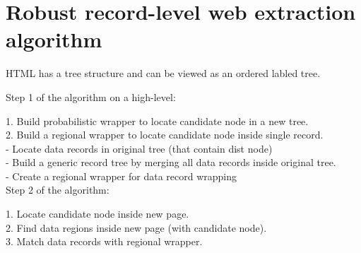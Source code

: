 \chapter{Robust record-level web extraction algorithm}

HTML has a tree structure and can be viewed as an ordered labled tree.

Step 1 of the algorithm on a high-level:

1. Build probabilistic wrapper to locate candidate node in a new tree.\\
2. Build a regional wrapper to locate candidate node inside single record.\\
   - Locate data records in original tree (that contain dist node)\\
   - Build a generic record tree by merging all data records inside original tree.\\
   - Create a regional wrapper for data record wrapping\\

Step 2 of the algorithm:

1. Locate candidate node inside new page.\\
2. Find data regions inside new page (with candidate node).\\
3. Match data records with regional wrapper.\\





